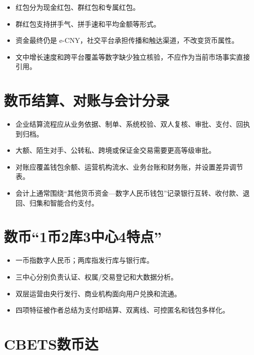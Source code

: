 \begin{itemize}
\tightlist
\item
  红包分为现金红包、群红包和专属红包。
\item
  群红包支持拼手气、拼手速和平均金额等形式。
\item
  资金最终仍是 e-CNY，社交平台承担传播和触达渠道，不改变货币属性。
\item
  文中增长速度和跨平台覆盖等数字缺少独立核验，不应作为当前市场事实直接引用。
\end{itemize}

\section{数币结算、对账与会计分录}\label{ux6570ux5e01ux7ed3ux7b97ux5bf9ux8d26ux4e0eux4f1aux8ba1ux5206ux5f55}

\begin{itemize}
\tightlist
\item
  企业结算流程应从业务依据、制单、系统校验、双人复核、审批、支付、回执到归档。
\item
  大额、陌生对手、公转私、跨境或保证金交易需要更高等级审批。
\item
  对账应覆盖钱包余额、运营机构流水、业务台账和财务账，并设置差异调节表。
\item
  会计上通常围绕``其他货币资金---数字人民币钱包''记录银行互转、收付款、退回、归集和智能合约支付。
\end{itemize}

\section{数币``1币2库3中心4特点''}\label{ux6570ux5e011ux5e012ux5e933ux4e2dux5fc34ux7279ux70b9}

\begin{itemize}
\tightlist
\item
  一币指数字人民币；两库指发行库与银行库。
\item
  三中心分别负责认证、权属/交易登记和大数据分析。
\item
  双层运营由央行发行、商业机构面向用户兑换和流通。
\item
  四项特征被作者总结为支付即结算、双离线、可控匿名和钱包多样化。
\end{itemize}

\section{CBETS数币达}\label{cbetsux6570ux5e01ux8fbe}

